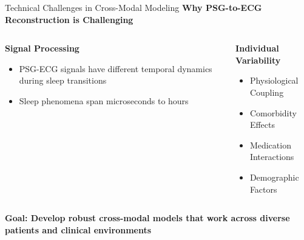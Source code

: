 \documentclass[aspectratio=169,11pt]{beamer}
\newcommand{\highlightbox}[2][tcairemred]{%
  \begin{center}
    \colorbox{#1!20}{\parbox{0.9\textwidth}{\centering\textcolor{#1}{\textbf{#2}}}}
  \end{center}}
\begin{document}
\begin{frame}{Technical Challenges in Cross-Modal Modeling}  
    \textbf{\textcolor{tcairemblue}{Why PSG-to-ECG Reconstruction is Challenging}}

  \begin{columns}[T]
    \begin{column}{0.5\textwidth}
      \textbf{\textcolor{tcairemred}{Signal Processing }}
      \begin{itemize}
        \item  PSG-ECG signals have different temporal dynamics during sleep transitions
        \vspace{0.3em}

        \item  Sleep phenomena span microseconds to hours
      \end{itemize}
    \end{column}
    \begin{column}{0.5\textwidth}
      \textbf{\textcolor{tcairemorange}{Individual Variability}}
      \begin{itemize}
        \item Physiological Coupling
        \vspace{0.3em}
        \item Comorbidity Effects 
        \vspace{0.3em}
        \item Medication Interactions
        \vspace{0.3em}
        \item Demographic Factors
      \end{itemize}
    \end{column}
  \end{columns}
    
  \vspace{0.5em}
  \highlightbox[tcairemgreen]{Goal: Develop robust cross-modal models that work across diverse patients and clinical environments}
\end{frame}
\end{document}
